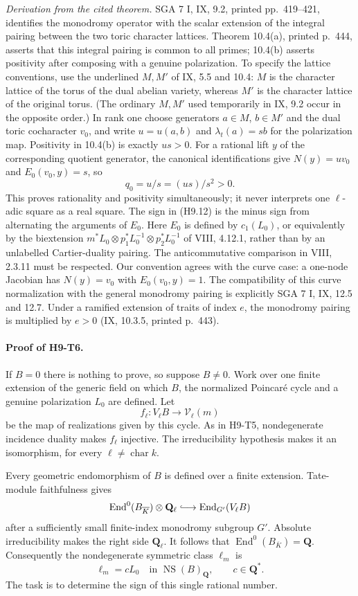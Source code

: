 \emph{Derivation from the cited theorem.} SGA 7 I, IX, 9.2, printed
pp.~419--421, identifies
the monodromy operator with the scalar extension of the integral
pairing between the two toric character lattices. Theorem 10.4(a),
printed p.~444, asserts that this integral pairing is common to all
primes; 10.4(b) asserts positivity after composing with a genuine
polarization. To specify the lattice conventions, use the underlined
$M,M'$ of IX, 5.5 and 10.4: $M$ is the character lattice of the torus
of the dual abelian variety, whereas $M'$ is the character lattice
of the original torus. (The ordinary $M,M'$ used temporarily in
IX, 9.2 occur in the opposite order.) In rank one choose generators
$a\in M$, $b\in M'$ and the dual toric cocharacter $v_0$, and write
$u=u(a,b)$ and $\lambda_t(a)=s b$ for the polarization map.
Positivity in 10.4(b) is exactly $us>0$.
For a rational lift $y$ of the corresponding quotient generator,
the canonical identifications give $N(y)=u v_0$ and
$E_0(v_0,y)=s$, so
\[
 q_0=u/s=(us)/s^2>0.
\]
This proves rationality and positivity simultaneously; it never interprets
one $\ell$-adic square as a real square. The sign in (H9.12) is the minus
sign from alternating the arguments of $E_0$. Here $E_0$ is defined
by $c_1(L_0)$, or equivalently by the biextension
$m^*L_0\otimes p_1^*L_0^{-1}\otimes p_2^*L_0^{-1}$ of
VIII, 4.12.1, rather than by an unlabelled Cartier-duality pairing.
The anticommutative comparison in VIII, 2.3.11 must be respected.
Our convention agrees with the curve
case: a one-node Jacobian has $N(y)=v_0$ with
$E_0(v_0,y)=1$. The compatibility of this curve normalization with
the general monodromy pairing is explicitly SGA 7 I, IX, 12.5 and 12.7.
Under a ramified extension of traits of index $e$, the monodromy pairing
is multiplied by $e>0$ (IX, 10.3.5, printed p.~443).

\paragraph{Proof of H9-T6.}
If $B=0$ there is nothing to prove, so suppose $B\ne0$. Work over one
finite extension of the generic field on which $B$, the normalized
Poincar\'e cycle and a genuine polarization $L_0$ are defined. Let
\[
 f_\ell:V_\ell B\longrightarrow\mathcal V_\ell(m)
\]
be the map of realizations given by this cycle. As in H9-T5,
nondegenerate incidence duality makes $f_\ell$ injective. The
irreducibility hypothesis makes it an isomorphism, for every
$\ell\ne\operatorname{char}k$.

Every geometric endomorphism of $B$ is defined over a finite extension.
Tate-module faithfulness gives
\[
 \operatorname{End}^0(B_{\overline K})\otimes\mathbf Q_\ell
   \lhook\joinrel\longrightarrow
 \operatorname{End}_{G'}(V_\ell B)
\]
after a sufficiently small finite-index monodromy subgroup $G'$.
Absolute irreducibility makes the right side $\mathbf Q_\ell$.
It follows that $\operatorname{End}^0(B_{\overline K})=\mathbf Q$.
Consequently the nondegenerate symmetric class $\ell_m$ is
\[
 \ell_m=c L_0\quad\text{in }\operatorname{NS}(B)_{\mathbf Q},
 \qquad c\in\mathbf Q^* .                              \tag{H9.13}
\]
The task is to determine the sign of this single rational number.

